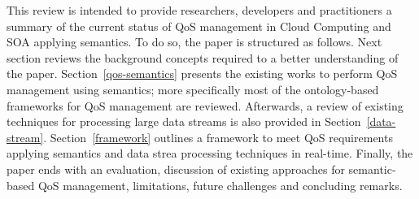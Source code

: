 This review is intended to provide researchers, developers and practitioners a summary of the current status of QoS management in Cloud Computing and SOA applying semantics. To do so, the paper 
is structured as follows. Next section reviews the background concepts required to a better understanding of the paper. Section~\ref{qos-semantics} 
presents the existing works to perform QoS management using semantics; more specifically most of the ontology-based frameworks for 
QoS management are reviewed. Afterwards, a review of existing techniques for processing large data streams is also provided in Section~\ref{data-stream}. 
Section~\ref{framework} outlines a framework to meet QoS requirements applying semantics and data strea processing techniques in real-time. 
Finally, the paper ends with an evaluation, discussion of existing approaches for semantic-based QoS management, 
limitations, future challenges and concluding remarks. 

